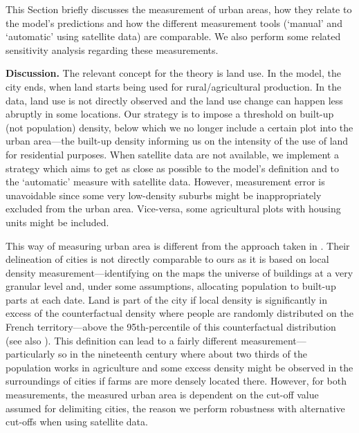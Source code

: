 \documentclass[11pt]{report}
\begin{document}
This Section briefly discusses the measurement of urban areas, how they relate to the model's predictions and how the different measurement tools (`manual' and `automatic' using satellite data) are comparable. We also perform some related sensitivity analysis regarding these measurements. 

\textbf{Discussion.} The relevant concept for the theory is land use. In the model, the city ends, when land starts being used for rural/agricultural production. In the data, land use is not directly observed and the land use change can happen less abruptly in some locations. Our strategy is to impose a threshold on built-up (not population) density, below which we no longer include a certain plot into the urban area---the built-up density informing us on the intensity of the use of land for residential purposes. When satellite data are not available, we implement a strategy which aims to get as close as possible to the model's definition and to the `automatic' measure with satellite data. However, measurement error is unavoidable since some very low-density suburbs might be inappropriately excluded from the urban area. Vice-versa, some agricultural plots with housing units might be included. 

This way of measuring urban area is different from the approach taken in \cite{combesetal2021}. Their delineation of cities is not directly comparable to ours as it is based on local density measurement---identifying on the maps the universe of buildings at a very granular level and, under some assumptions, allocating population to built-up parts at each date. Land is part of the city if local density is significantly in excess of the counterfactual density where people are randomly distributed on the French territory---above the 95th-percentile of this counterfactual distribution (see also \cite{delineating-JUE}). This definition can lead to a fairly different measurement---particularly so in the nineteenth century where about two thirds of the population works in agriculture and some excess density might be observed in the surroundings of cities if farms are more densely located there. However, for both measurements, the measured urban area is dependent on the cut-off value assumed for delimiting cities, the reason we perform robustness with alternative cut-offs when using satellite data.
\end{document}
